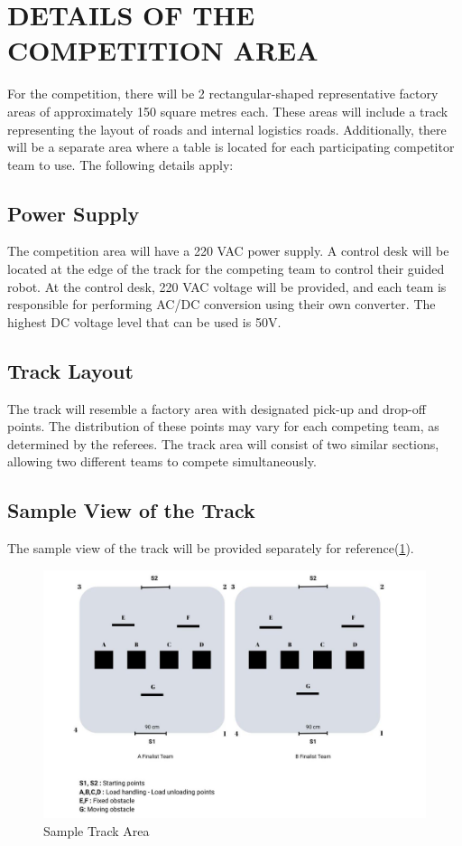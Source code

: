 \documentclass[../../main]{subfiles}
\begin{document}
\section{DETAILS OF THE COMPETITION AREA}

For the competition, there will be 2 rectangular-shaped representative factory areas of approximately 150 square metres each. These areas will include a track representing the layout of roads and internal logistics roads. Additionally, there will be a separate area where a table is located for each participating competitor team to use. The following details apply:

\subsection{Power Supply}
The competition area will have a 220 VAC power supply. A control desk will be located at the edge of the track for the competing team to control their guided robot. At the control desk, 220 VAC voltage will be provided, and each team is responsible for performing AC/DC conversion using their own converter. The highest DC voltage level that can be used is 50V.


\subsection{Track Layout}
The track will resemble a factory area with designated pick-up and drop-off points. The distribution of these points may vary for each competing team, as determined by the referees. The track area will consist of two similar sections, allowing two different teams to compete simultaneously.

\newpage
\subsection{Sample View of the Track}
The sample view of the track will be provided separately for reference(\cref{fig:tekno}).

\begin{figure}[h!]
    \centering
    \includegraphics[width=\textwidth]{img/cmparea.jpg}
    \caption{Sample Track Area}
    \label{fig:tekno}
\end{figure}
\end{document}
